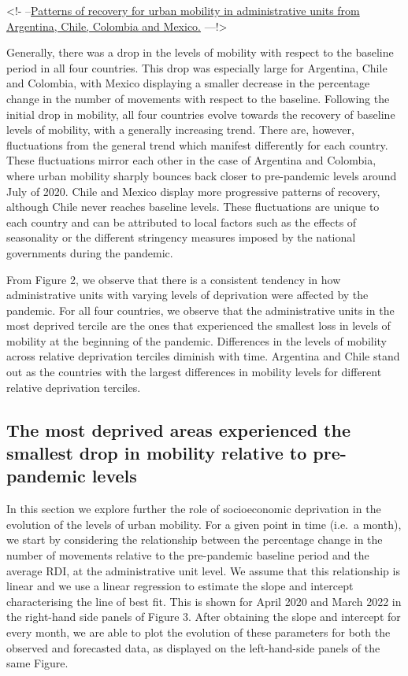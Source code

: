 \documentclass[
  11pt,
]{article}
\begin{document}
\textless!- --\href{figures/prediction-rdi-band.pdf}{Patterns of
recovery for urban mobility in administrative units from Argentina,
Chile, Colombia and Mexico.} ---!\textgreater{}

Generally, there was a drop in the levels of mobility with respect to
the baseline period in all four countries. This drop was especially
large for Argentina, Chile and Colombia, with Mexico displaying a
smaller decrease in the percentage change in the number of movements
with respect to the baseline. Following the initial drop in mobility,
all four countries evolve towards the recovery of baseline levels of
mobility, with a generally increasing trend. There are, however,
fluctuations from the general trend which manifest differently for each
country. These fluctuations mirror each other in the case of Argentina
and Colombia, where urban mobility sharply bounces back closer to
pre-pandemic levels around July of 2020. Chile and Mexico display more
progressive patterns of recovery, although Chile never reaches baseline
levels. These fluctuations are unique to each country and can be
attributed to local factors such as the effects of seasonality or the
different stringency measures imposed by the national governments during
the pandemic.

From Figure 2, we observe that there is a consistent tendency in how
administrative units with varying levels of deprivation were affected by
the pandemic. For all four countries, we observe that the administrative
units in the most deprived tercile are the ones that experienced the
smallest loss in levels of mobility at the beginning of the pandemic.
Differences in the levels of mobility across relative deprivation
terciles diminish with time. Argentina and Chile stand out as the
countries with the largest differences in mobility levels for different
relative deprivation terciles.

\subsection{The most deprived areas experienced the smallest drop in
mobility relative to pre-pandemic
levels}\label{the-most-deprived-areas-experienced-the-smallest-drop-in-mobility-relative-to-pre-pandemic-levels}

In this section we explore further the role of socioeconomic deprivation
in the evolution of the levels of urban mobility. For a given point in
time (i.e.~a month), we start by considering the relationship between
the percentage change in the number of movements relative to the
pre-pandemic baseline period and the average RDI, at the administrative
unit level. We assume that this relationship is linear and we use a
linear regression to estimate the slope and intercept characterising the
line of best fit. This is shown for April 2020 and March 2022 in the
right-hand side panels of Figure 3. After obtaining the slope and
intercept for every month, we are able to plot the evolution of these
parameters for both the observed and forecasted data, as displayed on
the left-hand-side panels of the same Figure.
\end{document}
